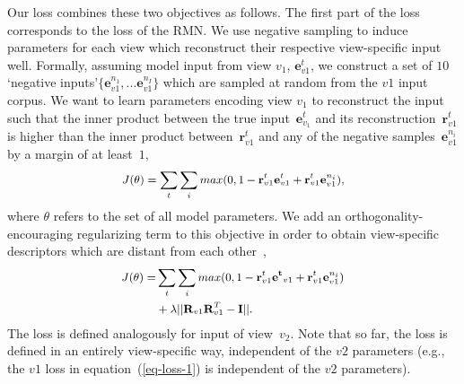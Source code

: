 \documentclass[11pt,letterpaper]{article}
\begin{document}
Our loss combines these two objectives as follows. The first part of the loss corresponds to the loss of the RMN. We use negative sampling to induce parameters for each view which reconstruct their respective view-specific input well. Formally, assuming model input from view $v_1$, $\mathbf{e}_{v1}^t$, we construct a set of $10$ `negative inputs'\mbox{$\{\mathbf{e}_{v1}^{n_1},...\mathbf{e}_{v1}^{n_I}\}$} which are sampled at random from the $v1$ input corpus. We want to learn parameters encoding view $v_1$ to reconstruct the input such that the inner product between the true input~$\mathbf{e}_{v_1}^t$ and its reconstruction~$\mathbf{r}_{v1}^t$ is 
higher than the inner product between~$\mathbf{r}_{v1}^t$ and any of the negative samples~$\mathbf{e}_{v1}^{n_i}$ by a margin of at least~$1$,
\begin{equation}
\small
 \begin{aligned}
   J(\theta) =\sum_t \sum_i max(0, 1-\mathbf{r}_{v1}^t\mathbf{e}^t_{v1} + \mathbf{r}_{v1}^t\mathbf{e}^{n_i}_{v1}),
 \end{aligned}
\end{equation}
where $\theta$ refers to the set of all model parameters. We add an orthogonality-encouraging regularizing term to this objective in order to obtain view-specific descriptors which are distant from each other~\citep{Hyvarinen:2000},
\begin{equation}
\small
 \begin{aligned}
 \label{eq-loss-1}
  J(\theta) = & \sum_t\sum_i max(0, 1-\mathbf{r}_{v1}^t\mathbf{e^t}_{v1} + \mathbf{r}_{v1}^t\mathbf{e}^{n_i}_{v1}) \\&+ \lambda ||\mathbf{R}_{v1}\mathbf{R}_{v1}^T-\mathbf{I}||.
  \end{aligned}
\end{equation}
The loss is defined analogously for input of view~$v_2$. Note that so far, the loss is defined in an entirely view-specific way, independent of the $v2$ parameters (e.g., the $v1$ loss in equation~(\ref{eq-loss-1}) is independent of the $v2$ parameters).
\end{document}
